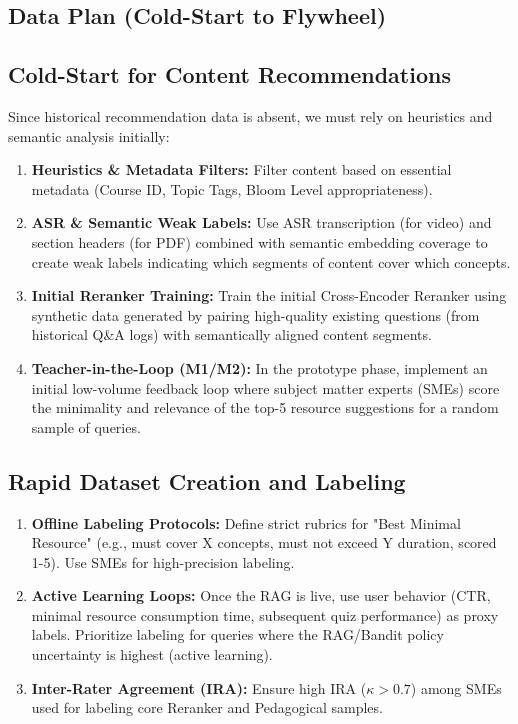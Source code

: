 \documentclass[12pt]{article}
\begin{document}
\begin{enumerate}
\section{Data Plan (Cold-Start to Flywheel)}

\subsection{Cold-Start for Content Recommendations}
Since historical recommendation data is absent, we must rely on heuristics and semantic analysis initially:
\begin{enumerate}
    \item \textbf{Heuristics \& Metadata Filters:} Filter content based on essential metadata (Course ID, Topic Tags, Bloom Level appropriateness).
    \item \textbf{ASR \& Semantic Weak Labels:} Use ASR transcription (for video) and section headers (for PDF) combined with semantic embedding coverage to create weak labels indicating which segments of content cover which concepts.
    \item \textbf{Initial Reranker Training:} Train the initial Cross-Encoder Reranker using synthetic data generated by pairing high-quality existing questions (from historical Q\&A logs) with semantically aligned content segments.
    \item \textbf{Teacher-in-the-Loop (M1/M2):} In the prototype phase, implement an initial low-volume feedback loop where subject matter experts (SMEs) score the minimality and relevance of the top-5 resource suggestions for a random sample of queries.
\end{enumerate}

\subsection{Rapid Dataset Creation and Labeling}
\begin{enumerate}
    \item \textbf{Offline Labeling Protocols:} Define strict rubrics for "Best Minimal Resource" (e.g., must cover X concepts, must not exceed Y duration, scored 1-5). Use SMEs for high-precision labeling.
    \item \textbf{Active Learning Loops:} Once the RAG is live, use user behavior (CTR, minimal resource consumption time, subsequent quiz performance) as proxy labels. Prioritize labeling for queries where the RAG/Bandit policy uncertainty is highest (active learning).
    \item \textbf{Inter-Rater Agreement (IRA):} Ensure high IRA ($\kappa > 0.7$) among SMEs used for labeling core Reranker and Pedagogical samples.
\end{enumerate}


\end{enumerate}
\end{document}
